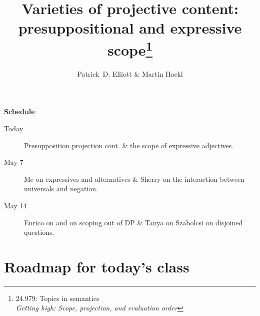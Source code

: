 \documentclass[nols,twoside,nofonts,nobib,nohyper]{tufte-handout}
\title{Varieties of projective content:\\presuppositional and expressive scope\thanks{24.979: Topics in
    semantics\\\noindent\textit{Getting high: Scope, projection, and evaluation order}}}
\author[Patrick D. Elliott and Martin Hackl]{Patrick~D. Elliott \& Martin Hackl}
\begin{document}
\maketitle%

\begin{tcolorbox}
\textbf{Schedule}
\tcblower

\begin{description}

    \item[Today] Presupposition projection cont. \& the scope of expressive adjectives.

    \item[May 7] Me on expressives and alternatives \& Sherry on the interaction between universals and negation.

    \item[May 14] Enrico on \cite{Sauerlanda} and \cite{Charlow} on scoping out of DP \& Tanya on Szabolcsi on disjoined questions.

\end{description}
\end{tcolorbox}

\section{Roadmap for today's class}
\end{document}
